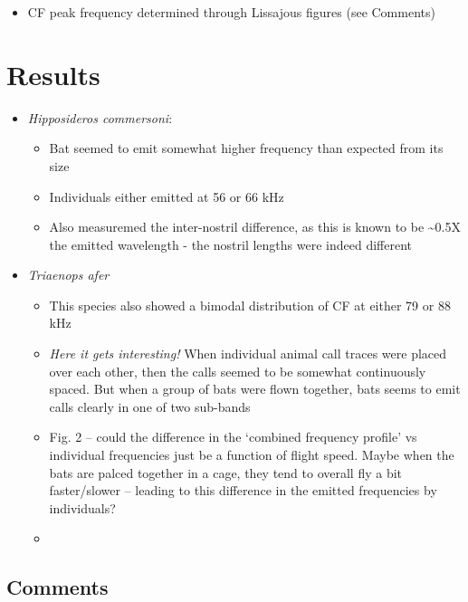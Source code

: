 \documentclass[
]{book}
\providecommand{\tightlist}{%
  \setlength{\itemsep}{0pt}\setlength{\parskip}{0pt}}
\begin{document}
\begin{itemize}
\tightlist
\item
  CF peak frequency determined through Lissajous figures (see Comments)
\end{itemize}

\hypertarget{results-5}{%
\section{Results}\label{results-5}}

\begin{itemize}
\tightlist
\item
  \emph{Hipposideros commersoni}:

  \begin{itemize}
  \tightlist
  \item
    Bat seemed to emit somewhat higher frequency than expected from its size
  \item
    Individuals either emitted at 56 or 66 kHz
  \item
    Also measuremed the inter-nostril difference, as this is known to be \textasciitilde0.5X the emitted wavelength - the nostril lengths were indeed different
  \end{itemize}
\item
  \emph{Triaenops afer}

  \begin{itemize}
  \item
    This species also showed a bimodal distribution of CF at either 79 or 88 kHz
  \item
    \emph{Here it gets interesting!} When individual animal call traces were placed over each other, then the calls seemed to be somewhat continuously spaced. But when a group of bats were flown together, bats seems to emit calls clearly in one of two sub-bands
  \item
    Fig. 2 -- could the difference in the `combined frequency profile' vs individual frequencies just be a function of flight speed. Maybe when the bats are palced together in a cage, they tend to overall fly a bit faster/slower -- leading to this difference in the emitted frequencies by individuals?
  \item
  \end{itemize}
\end{itemize}

\hypertarget{comments-3}{%
\subsection{Comments}\label{comments-3}}
\end{document}
